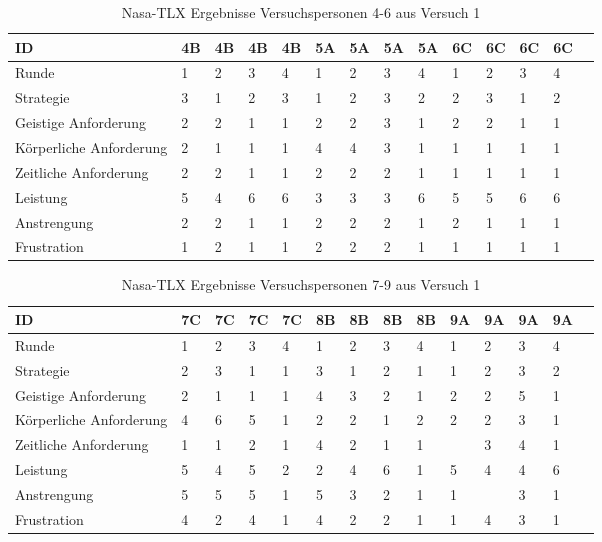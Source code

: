 \documentclass[12pt,a4paper]{scrartcl}
\begin{document}
\begin{appendix}
\begin{table}
\bigskip\bigskip  %
\caption{Nasa-TLX Ergebnisse Versuchspersonen 4-6 aus Versuch 1}

\smallskip
\begin{tabular}{|p{6cm}| p{0.8cm} | p{0.8cm} | p{0.8cm} | p{0.8cm} || p{0.8cm} | p{0.8cm} | p{0.8cm} | p{0.8cm} || p{0.8cm} | p{0.8cm} | p{0.8cm} | p{0.8cm} | p{} | }
\hline
	ID & 4B & 4B & 4B & 4B & 5A & 5A & 5A & 5A & 6C & 6C & 6C & 6C \\ \hline \hline
	Runde & 1 & 2 & 3 & 4 & 1 & 2 & 3 & 4 & 1 & 2 & 3 & 4 \\ \hline
	Strategie & 3 & 1 & 2 & 3 & 1 & 2 & 3 & 2 & 2 & 3 & 1 & 2 \\ \hline \hline
	Geistige Anforderung & 2 & 2 & 1 & 1 & 2 & 2 & 3 & 1 & 2 & 2 & 1 & 1 \\ \hline
	Körperliche Anforderung & 2 & 1 & 1 & 1 & 4 & 4 & 3 & 1 & 1 & 1 & 1 & 1 \\ \hline
	Zeitliche Anforderung & 2 & 2 & 1 & 1 & 2 & 2 & 2 & 1 & 1 & 1 & 1 & 1 \\ \hline
	Leistung & 5 & 4 & 6 & 6 & 3 & 3 & 3 & 6 & 5 & 5 & 6 & 6 \\ \hline
	Anstrengung & 2 & 2 & 1 & 1 & 2 & 2 & 2 & 1 & 2 & 1 & 1 & 1 \\ \hline
	Frustration & 1 & 2 & 1 & 1 & 2 & 2 & 2 & 1 & 1 & 1 & 1 & 1 \\ \hline
\end{tabular}
\end{table}

\begin{table}
\caption{Nasa-TLX Ergebnisse Versuchspersonen 7-9 aus Versuch 1}

\smallskip
\begin{tabular}{|p{6cm}| p{0.8cm} | p{0.8cm} | p{0.8cm} | p{0.8cm} || p{0.8cm} | p{0.8cm} | p{0.8cm} | p{0.8cm} || p{0.8cm} | p{0.8cm} | p{0.8cm} | p{0.8cm} | p{} | }
\hline
	ID & 7C & 7C & 7C & 7C & 8B & 8B & 8B & 8B & 9A & 9A & 9A & 9A \\ \hline \hline
	Runde & 1 & 2 & 3 & 4 & 1 & 2 & 3 & 4 & 1 & 2 & 3 & 4 \\ \hline
	Strategie & 2 & 3 & 1 & 1 & 3 & 1 & 2 & 1 & 1 & 2 & 3 & 2 \\ \hline \hline
	Geistige Anforderung & 2 & 1 & 1 & 1 & 4 & 3 & 2 & 1 & 2 & 2 & 5 & 1 \\ \hline
	Körperliche Anforderung & 4 & 6 & 5 & 1 & 2 & 2 & 1 & 2 & 2 & 2 & 3 & 1 \\ \hline
	Zeitliche Anforderung & 1 & 1 & 2 & 1 & 4 & 2 & 1 & 1 &  & 3 & 4 & 1 \\ \hline
	Leistung & 5 & 4 & 5 & 2 & 2 & 4 & 6 & 1 & 5 & 4 & 4 & 6 \\ \hline
	Anstrengung & 5 & 5 & 5 & 1 & 5 & 3 & 2 & 1 & 1 &  & 3 & 1 \\ \hline
	Frustration & 4 & 2 & 4 & 1 & 4 & 2 & 2 & 1 & 1 & 4 & 3 & 1 \\ \hline
\end{tabular}


\end{table}
\end{appendix}
\end{document}
